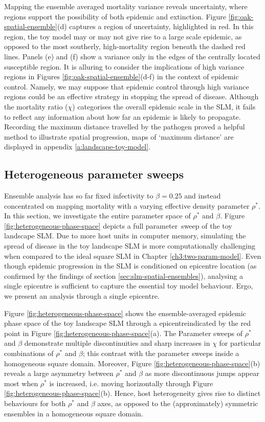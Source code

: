 Mapping the ensemble averaged mortality variance reveals uncertainty, where regions support the possibility of both epidemic and extinction.
Figure \ref{fig:oak-spatial-ensemble}(d) captures a region of uncertainty, highlighted in red.
In this region, the toy model may or may not give rise to a large scale epidemic, as opposed to the most southerly, 
high-mortality region beneath the dashed red lines. Panels (e) and (f) show a variance only in the edges of the centrally
located susceptible region. It is alluring to consider the implications of high variance regions in Figures \ref{fig:oak-spatial-ensemble}(d-f)
in the context of epidemic control. Namely, we may suppose that epidemic control through high variance regions could be an effective strategy
in stopping the spread of disease.
Although the mortality ratio ($\chi$) categorises the overall epidemic scale in the SLM, 
it fails to reflect any information about how far an epidemic is likely to propagate.
Recording the maximum distance travelled by the pathogen proved a helpful method to illustrate spatial progression,
maps of `maximum distance' are displayed in appendix \ref{a:landscape-toy-model}. 


\subsection{Heterogeneous parameter sweeps}

Ensemble analysis has so far fixed infectivity to $\beta=0.25$
and instead concentrated on mapping mortality with a varying effective density parameter $\rho^*$.
In this section, we investigate the entire parameter space of $\rho^*$ and $\beta$.
Figure \ref{fig:heterogeneous-phase-space} depicts a full parameter sweep of the toy landscape SLM.
Due to more host units in computer memory, simulating the spread of disease in the toy landscape SLM is more 
computationally challenging when compared to the ideal square SLM in Chapter \ref{ch3:two-param-model}.
Even though epidemic progression in the SLM is conditioned on epicentre location (as confirmed by the findings of section \ref{sec:slm-spatial-ensembles}),
analysing a single epicentre is sufficient to capture the essential toy model behaviour.
Ergo, we present an analysis through a single epicentre.

Figure \ref{fig:heterogeneous-phase-space} shows the ensemble-averaged epidemic phase space of the toy landscape SLM
through a epicentre\textemdash indicated by the red point in Figure \ref{fig:heterogeneous-phase-space}(a).
The Parameter sweeps of $\rho^{*}$ and $\beta$ demonstrate multiple discontinuities and sharp increases in $\chi$
for particular combinations of $\rho^{*}$ and $\beta$; this contrast with the parameter sweeps inside a homogeneous square domain.
Moreover, Figure \ref{fig:heterogeneous-phase-space}(b) reveals a large asymmetry between $\rho^*$ and $\beta$ 
as more discontinuous jumps appear most when $\rho^*$ is increased, i.e. moving horizontally 
through Figure \ref{fig:heterogeneous-phase-space}(b). Hence, host heterogeneity gives rise to distinct behaviours for both
$\rho^*$ and $\beta$ axes, as opposed to the (approximately) symmetric ensembles in a homogeneous square domain.  

